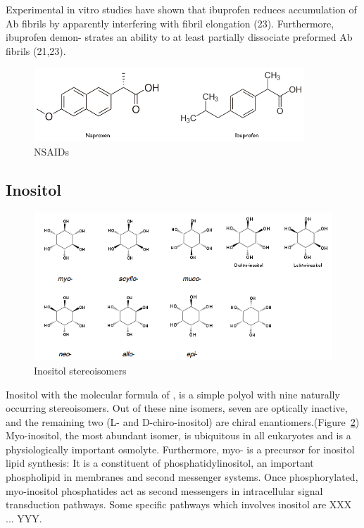 Experimental in vitro studies have shown that ibuprofen reduces accumulation of Ab fibrils by apparently interfering with fibril elongation (23). Furthermore, ibuprofen demon- strates an ability to at least partially dissociate preformed Ab fibrils (21,23).

\begin{figure}
\centering
\includegraphics[width=4in]{figures/introduction/nsaids.png}
\caption[NSAIDs]{NSAIDs}
\label{fig:nsaids}
\end{figure}

\subsection{Inositol}
\begin{figure}
	\centering
	\includegraphics[width=6in]{figures/introduction/inositol.png}
	\caption[Inositol]{Inositol stereoisomers}
	\label{fig:inositols}
\end{figure}

Inositol with the molecular formula of , is a simple polyol with nine naturally occurring stereoisomers. Out of these nine isomers, seven are optically inactive, and the remaining two (L- and D-chiro-inositol) are chiral enantiomers.(Figure~\ref{fig:inositols}) Myo-inositol, the most abundant isomer, is ubiquitous in all eukaryotes and is a physiologically important osmolyte.  Furthermore, myo- is a precursor for inositol lipid synthesis: It is a constituent of phosphatidylinositol, an important phospholipid in membranes and second messenger systems. Once phosphorylated, myo-inositol phosphatides act as second messengers in intracellular signal transduction pathways.\cite{Fisher:2002tk} Some specific pathways which involves inositol are XXX ... YYY.\cite{That nature paper from 2008 on inositides}

